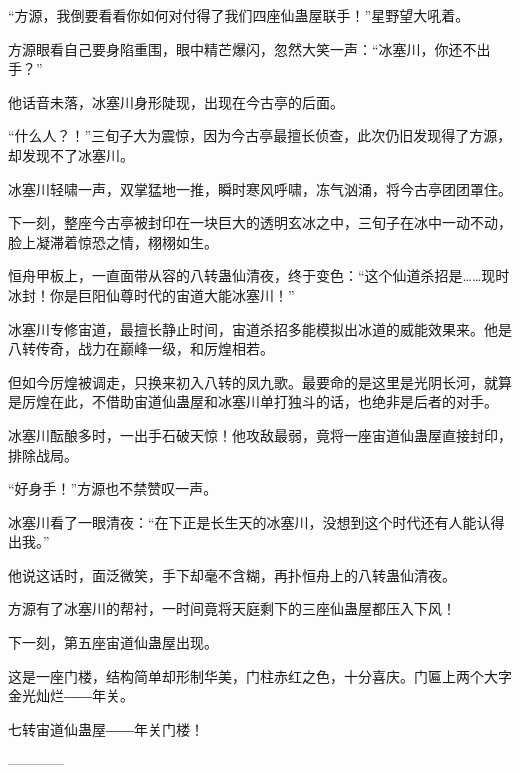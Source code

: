 \begin{this_body}
“方源，我倒要看看你如何对付得了我们四座仙蛊屋联手！”星野望大吼着。

方源眼看自己要身陷重围，眼中精芒爆闪，忽然大笑一声：“冰塞川，你还不出手？”

他话音未落，冰塞川身形陡现，出现在今古亭的后面。

“什么人？！”三旬子大为震惊，因为今古亭最擅长侦查，此次仍旧发现得了方源，却发现不了冰塞川。

冰塞川轻啸一声，双掌猛地一推，瞬时寒风呼啸，冻气汹涌，将今古亭团团罩住。

下一刻，整座今古亭被封印在一块巨大的透明玄冰之中，三旬子在冰中一动不动，脸上凝滞着惊恐之情，栩栩如生。

恒舟甲板上，一直面带从容的八转蛊仙清夜，终于变色：“这个仙道杀招是……现时冰封！你是巨阳仙尊时代的宙道大能冰塞川！”

冰塞川专修宙道，最擅长静止时间，宙道杀招多能模拟出冰道的威能效果来。他是八转传奇，战力在巅峰一级，和厉煌相若。

但如今厉煌被调走，只换来初入八转的凤九歌。最要命的是这里是光阴长河，就算是厉煌在此，不借助宙道仙蛊屋和冰塞川单打独斗的话，也绝非是后者的对手。

冰塞川酝酿多时，一出手石破天惊！他攻敌最弱，竟将一座宙道仙蛊屋直接封印，排除战局。

“好身手！”方源也不禁赞叹一声。

冰塞川看了一眼清夜：“在下正是长生天的冰塞川，没想到这个时代还有人能认得出我。”

他说这话时，面泛微笑，手下却毫不含糊，再扑恒舟上的八转蛊仙清夜。

方源有了冰塞川的帮衬，一时间竟将天庭剩下的三座仙蛊屋都压入下风！

下一刻，第五座宙道仙蛊屋出现。

这是一座门楼，结构简单却形制华美，门柱赤红之色，十分喜庆。门匾上两个大字金光灿烂――年关。

七转宙道仙蛊屋――年关门楼！

------------

\end{this_body}


